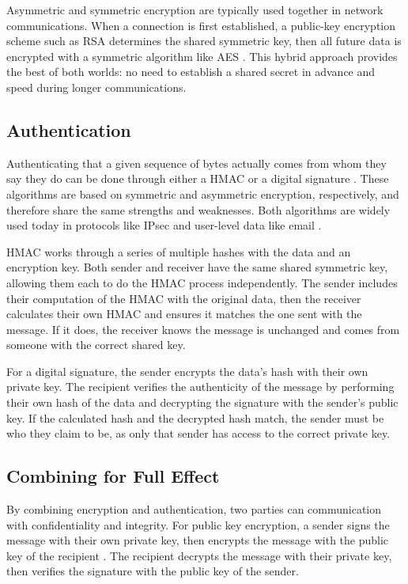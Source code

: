 \par Asymmetric and symmetric encryption are typically used together in network communications. When a connection is first established, a public-key encryption scheme such as \ac{RSA} determines the shared symmetric key, then all future data is encrypted with a symmetric algorithm like \ac{AES} \cite{HybridEncryption}. This hybrid approach provides the best of both worlds: no need to establish a shared secret in advance and speed during longer communications.

\subsection{Authentication}
\label{sec:authentication}
\par Authenticating that a given sequence of bytes actually comes from whom they say they do can be done through either a \ac{HMAC} \cite{rfc2104} or a digital signature \cite{rfc3447}. These algorithms are based on symmetric and asymmetric encryption, respectively, and therefore share the same strengths and weaknesses. Both algorithms are widely used today in protocols like \ac{IPsec} \cite{rfc2404} and user-level data like email \cite{rfc5751}.

\par \ac{HMAC} works through a series of multiple hashes with the data and an encryption key. Both sender and receiver have the same shared symmetric key, allowing them each to do the \ac{HMAC} process independently. The sender includes their computation of the \ac{HMAC} with the original data, then the receiver calculates their own HMAC and ensures it matches the one sent with the message. If it does, the receiver knows the message is unchanged and comes from someone with the correct shared key.

\par For a digital signature, the sender encrypts the data's hash with their own private key. The recipient verifies the authenticity of the message by performing their own hash of the data and decrypting the signature with the sender's public key. If the calculated hash and the decrypted hash match, the sender must be who they claim to be, as only that sender has access to the correct private key.

\subsection{Combining for Full Effect}
\label{sec:auth_and_encrypt}
\par By combining encryption and authentication, two parties can communication with confidentiality and integrity. For public key encryption, a sender signs the message with their own private key, then encrypts the message with the public key of the recipient \cite{An01authenticatedencryption}. The recipient decrypts the message with their private key, then verifies the signature with the public key of the sender.

